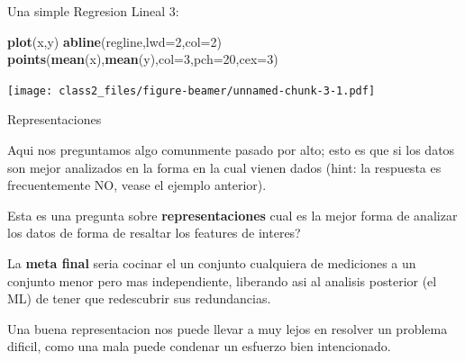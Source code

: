 \documentclass[ignorenonframetext,]{beamer}
\newenvironment{Shaded}{\begin{snugshade}}{\end{snugshade}}
\newcommand{\KeywordTok}[1]{\textcolor[rgb]{0.13,0.29,0.53}{\textbf{#1}}}
\newcommand{\DataTypeTok}[1]{\textcolor[rgb]{0.13,0.29,0.53}{#1}}
\newcommand{\DecValTok}[1]{\textcolor[rgb]{0.00,0.00,0.81}{#1}}
\newcommand{\NormalTok}[1]{#1}
\begin{document}
\begin{frame}[fragile]

\begin{block}{Una simple Regresion Lineal 3:}

\begin{Shaded}
\begin{Highlighting}[]
\KeywordTok{plot}\NormalTok{(x,y)}
\KeywordTok{abline}\NormalTok{(regline,}\DataTypeTok{lwd=}\DecValTok{2}\NormalTok{,}\DataTypeTok{col=}\DecValTok{2}\NormalTok{)}
\KeywordTok{points}\NormalTok{(}\KeywordTok{mean}\NormalTok{(x),}\KeywordTok{mean}\NormalTok{(y),}\DataTypeTok{col=}\DecValTok{3}\NormalTok{,}\DataTypeTok{pch=}\DecValTok{20}\NormalTok{,}\DataTypeTok{cex=}\DecValTok{3}\NormalTok{)}
\end{Highlighting}
\end{Shaded}

\texttt{[image: class2\_files/figure-beamer/unnamed-chunk-3-1.pdf]}

\end{block}

\end{frame}

\begin{frame}

\begin{block}{Representaciones}

Aqui nos preguntamos algo comunmente pasado por alto; esto es que si los
datos son mejor analizados en la forma en la cual vienen dados (hint: la
respuesta es frecuentemente NO, vease el ejemplo anterior).

Esta es una pregunta sobre \textbf{representaciones} cual es la mejor
forma de analizar los datos de forma de resaltar los features de
interes?

La \textbf{meta final} seria cocinar el un conjunto cualquiera de
mediciones a un conjunto menor pero mas independiente, liberando asi al
analisis posterior (el ML) de tener que redescubrir sus redundancias.

Una buena representacion nos puede llevar a muy lejos en resolver un
problema dificil, como una mala puede condenar un esfuerzo bien
intencionado.

\end{block}

\end{frame}
\end{document}
